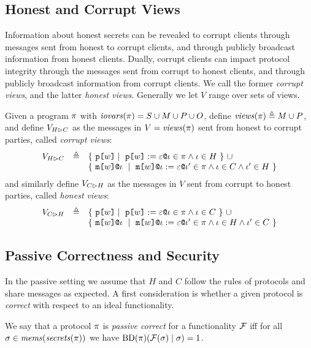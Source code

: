 \subsection{Honest and Corrupt Views}

Information about honest secrets can be revealed to corrupt clients
through messages sent from honest to corrupt clients, and through
publicly broadcast information from honest clients. Dually,
corrupt clients can impact protocol integrity through the messages
sent from corrupt to honest clients, and through publicly broadcast information
from corrupt clients. We call the former \emph{corrupt views}, and
the latter \emph{honest views}. Generally we let $V$ range over sets
of views.
\begin{definition}
  Given a program $\pi$ with $\mathit{iovars}(\pi) = S \cup M \cup P \cup O$,
  define $\mathit{views}(\pi) \triangleq M \cup P$, and define $V_{H \rhd C}$ as the messages in
  $V = \mathit{views}(\pi)$ sent from honest
  to corrupt parties, called \emph{corrupt views}:
  $$
  \begin{array}{lcl}
    \houtputs & \defeq
        & \{\ \rvl{w} \mid\ \reveal{w}{\be}{\cid} \in \prog \wedge \cid \in H \ \}\ \cup \\
      & & \{\ \elab{\mesg{w}}{\cid}\ \mid\  \eassign{\mesg{w}}{\cid}{\be}{\cid'} \in
           \prog \wedge \cid \in C \wedge \cid' \in H \ \} 
  \end{array}
  $$
  and similarly define $V_{C \rhd H}$ as the messages in $V$ sent from corrupt to honest
  parties, called \emph{honest views}:
  $$
  \begin{array}{lcl}
    \cinputs &  \defeq
        & \{\ \rvl{w} \mid\ \reveal{w}{\be}{\cid} \in \prog \wedge \cid \in C \ \} \ \cup\\
      & & \{\ \elab{\mesg{w}}{\cid}\ \mid\  \eassign{\mesg{w}}{\cid}{\be}{\cid'} \in
              \prog \wedge \cid \in H \wedge \cid' \in C \ \}
  \end{array}
  $$
\end{definition}

\subsection{Passive Correctness and Security}

In the passive setting we assume that $H$ and $C$ follow the
rules of protocols and share messages as expected. A first
consideration is whether a given protocol is \emph{correct}
with respect to an ideal functionality. 
\begin{definition}[Passive Correctness]
  We say that a protocol $\pi$ is \emph{passive correct} for a functionality
  $\mathcal{F}$ iff for all $\sigma \in \mathit{mems}(\mathit{secrets}(\pi))$
  we have $\mathrm{BD}(\pi)(\mathcal{F}(\sigma) \mid \sigma) = 1$.
\end{definition}

